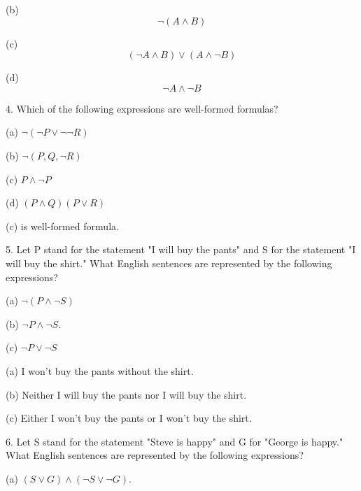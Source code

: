 \documentclass{article}
\begin{document}
(b) $$\neg (A \land B)$$
\vspace{10pt}

(c) $$(\neg A \land B) \lor (A \land \neg B)$$
\vspace{10pt}

(d) $$\neg A \land \neg B$$
\vspace{40pt}

4. Which of the following expressions are well-formed formulas?

\hspace{12pt}(a) $\neg (\neg P \lor \neg \neg R)$

\hspace{12pt}(b) $\neg (P, Q, \neg R)$

\hspace{12pt}(c) $P \land \neg P$

\hspace{12pt}(d) $(P \land Q)(P \lor R)$
\vspace{20pt}

\hspace{12pt}(c) is well-formed formula.
\vspace{40pt}

5. Let P stand for the statement "I will buy the pants" and S for the statement
"I will buy the shirt." What English sentences are represented by the following
expressions?

\hspace{12pt}(a) $\neg (P \land \neg S)$

\hspace{12pt}(b) $\neg P \land \neg S$.

\hspace{12pt}(c) $\neg P \lor \neg S$
\vspace{20pt}

(a) I won't buy the pants without the shirt.
\vspace{10pt}

(b) Neither I will buy the pants nor I will buy the shirt.
\vspace{10pt}

(c) Either I won't buy the pants or I won't buy the shirt.
\vspace{40pt}

6. Let S stand for the statement "Steve is happy" and G for "George is happy."
What English sentences are represented by the following expressions?

\hspace{12pt}(a) $(S \lor G) \land (\neg S \lor \neg G)$.
\end{document}

